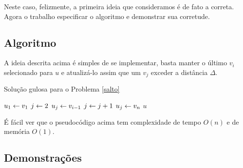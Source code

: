 Neste caso, felizmente, a primeira ideia que consideramos é de fato a correta. Agora o trabalho especificar o algoritmo e demonstrar sua corretude.

\subsection{Algoritmo}

A ideia descrita acima é simples de se implementar, basta manter o último $v_i$ selecionado para $u$ e atualizá-lo assim que um $v_j$ exceder a distância $\Delta$.

\begin{algorithm}[H]
\caption{Solução gulosa para o Problema \ref{salto}}
\label{salto:code}
\begin{algorithmic}[1]
    \State $u_1 \leftarrow v_1$
    \State $j \leftarrow 2$
            \State $u_j \leftarrow v_{i - 1}$
            \State $j \leftarrow j + 1$
        \EndIf
    \EndFor
    \State $u_j \leftarrow v_n$
    \State \Return $u$
\EndFunction
\end{algorithmic}
\end{algorithm}

É fácil ver que o pseudocódigo acima tem complexidade de tempo $O(n)$ e de memória $O(1)$.

\subsection{Demonstrações}

